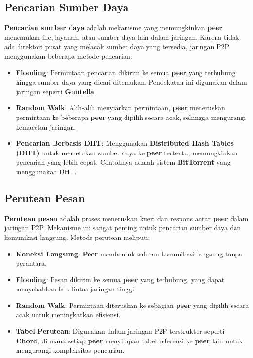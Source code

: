 \subsection{Pencarian Sumber Daya}
\textbf{Pencarian sumber daya} adalah mekanisme yang memungkinkan \textbf{peer} menemukan file, layanan, atau sumber daya lain dalam jaringan. Karena tidak ada direktori pusat yang melacak sumber daya yang tersedia, jaringan P2P menggunakan beberapa metode pencarian:
\begin{itemize}
	\item \textbf{Flooding}: Permintaan pencarian dikirim ke semua \textbf{peer} yang terhubung hingga sumber daya yang dicari ditemukan. Pendekatan ini digunakan dalam jaringan seperti \textbf{Gnutella}.
	\item \textbf{Random Walk}: Alih-alih menyiarkan permintaan, \textbf{peer} meneruskan permintaan ke beberapa \textbf{peer} yang dipilih secara acak, sehingga mengurangi kemacetan jaringan.
	\item \textbf{Pencarian Berbasis DHT}: Menggunakan \textbf{Distributed Hash Tables (DHT)} untuk memetakan sumber daya ke \textbf{peer} tertentu, memungkinkan pencarian yang lebih cepat. Contohnya adalah sistem \textbf{BitTorrent} yang menggunakan DHT.
\end{itemize}

\subsection{Perutean Pesan}
\textbf{Perutean pesan} adalah proses meneruskan kueri dan respons antar \textbf{peer} dalam jaringan P2P. Mekanisme ini sangat penting untuk pencarian sumber daya dan komunikasi langsung. Metode perutean meliputi:
\begin{itemize}
	\item \textbf{Koneksi Langsung}: \textbf{Peer} membentuk saluran komunikasi langsung tanpa perantara.
	\item \textbf{Flooding}: Pesan dikirim ke semua \textbf{peer} yang terhubung, yang dapat menyebabkan lalu lintas jaringan tinggi.
	\item \textbf{Random Walk}: Permintaan diteruskan ke sebagian \textbf{peer} yang dipilih secara acak untuk meningkatkan efisiensi.
	\item \textbf{Tabel Perutean}: Digunakan dalam jaringan P2P terstruktur seperti \textbf{Chord}, di mana setiap \textbf{peer} menyimpan tabel referensi ke \textbf{peer} lain untuk mengurangi kompleksitas pencarian.
\end{itemize}

